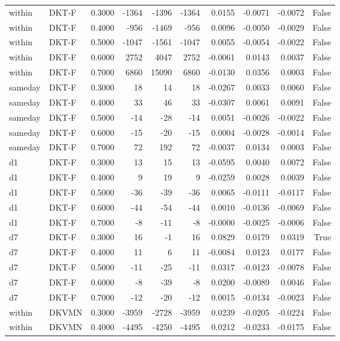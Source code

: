 \begin{tabular}{llrrrrrrrr}
within & DKT-F & 0.3000 & -1364 & -1396 & -1364 & 0.0155 & -0.0071 & -0.0072 & False \\
within & DKT-F & 0.4000 & -956 & -1469 & -956 & 0.0096 & -0.0050 & -0.0029 & False \\
within & DKT-F & 0.5000 & -1047 & -1561 & -1047 & 0.0055 & -0.0054 & -0.0022 & False \\
within & DKT-F & 0.6000 & 2752 & 4047 & 2752 & -0.0061 & 0.0143 & 0.0037 & False \\
within & DKT-F & 0.7000 & 6860 & 15090 & 6860 & -0.0130 & 0.0356 & 0.0003 & False \\
sameday & DKT-F & 0.3000 & 18 & 14 & 18 & -0.0267 & 0.0033 & 0.0060 & False \\
sameday & DKT-F & 0.4000 & 33 & 46 & 33 & -0.0307 & 0.0061 & 0.0091 & False \\
sameday & DKT-F & 0.5000 & -14 & -28 & -14 & 0.0051 & -0.0026 & -0.0022 & False \\
sameday & DKT-F & 0.6000 & -15 & -20 & -15 & 0.0004 & -0.0028 & -0.0014 & False \\
sameday & DKT-F & 0.7000 & 72 & 192 & 72 & -0.0037 & 0.0134 & 0.0003 & False \\
d1 & DKT-F & 0.3000 & 13 & 15 & 13 & -0.0595 & 0.0040 & 0.0072 & False \\
d1 & DKT-F & 0.4000 & 9 & 19 & 9 & -0.0259 & 0.0028 & 0.0039 & False \\
d1 & DKT-F & 0.5000 & -36 & -39 & -36 & 0.0065 & -0.0111 & -0.0117 & False \\
d1 & DKT-F & 0.6000 & -44 & -54 & -44 & 0.0010 & -0.0136 & -0.0069 & False \\
d1 & DKT-F & 0.7000 & -8 & -11 & -8 & -0.0000 & -0.0025 & -0.0006 & False \\
d7 & DKT-F & 0.3000 & 16 & -1 & 16 & 0.0829 & 0.0179 & 0.0319 & True \\
d7 & DKT-F & 0.4000 & 11 & 6 & 11 & -0.0084 & 0.0123 & 0.0177 & False \\
d7 & DKT-F & 0.5000 & -11 & -25 & -11 & 0.0317 & -0.0123 & -0.0078 & False \\
d7 & DKT-F & 0.6000 & -8 & -39 & -8 & 0.0200 & -0.0089 & 0.0046 & False \\
d7 & DKT-F & 0.7000 & -12 & -20 & -12 & 0.0015 & -0.0134 & -0.0023 & False \\
within & DKVMN & 0.3000 & -3959 & -2728 & -3959 & 0.0239 & -0.0205 & -0.0224 & False \\
within & DKVMN & 0.4000 & -4495 & -4250 & -4495 & 0.0212 & -0.0233 & -0.0175 & False \\

\end{tabular}
